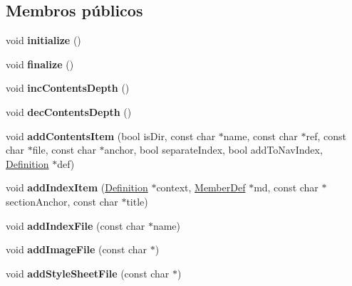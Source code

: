 \subsection*{Membros públicos}
\begin{DoxyCompactItemize}
\item 
\hypertarget{class_doc_sets_a25a40b6614565f755233080a384c35f1}{void {\bfseries initialize} ()}\label{class_doc_sets_a25a40b6614565f755233080a384c35f1}

\item 
\hypertarget{class_doc_sets_a32d626626eee0bc4ade146973f6abb1c}{void {\bfseries finalize} ()}\label{class_doc_sets_a32d626626eee0bc4ade146973f6abb1c}

\item 
\hypertarget{class_doc_sets_a96772b5eeae8044b3308f63fb040c253}{void {\bfseries inc\-Contents\-Depth} ()}\label{class_doc_sets_a96772b5eeae8044b3308f63fb040c253}

\item 
\hypertarget{class_doc_sets_a3a6a2629dd91105d0048f0d0a9f7f983}{void {\bfseries dec\-Contents\-Depth} ()}\label{class_doc_sets_a3a6a2629dd91105d0048f0d0a9f7f983}

\item 
\hypertarget{class_doc_sets_a2037325cd2bf36b4a134b87dbb107a94}{void {\bfseries add\-Contents\-Item} (bool is\-Dir, const char $\ast$name, const char $\ast$ref, const char $\ast$file, const char $\ast$anchor, bool separate\-Index, bool add\-To\-Nav\-Index, \hyperlink{class_definition}{Definition} $\ast$def)}\label{class_doc_sets_a2037325cd2bf36b4a134b87dbb107a94}

\item 
\hypertarget{class_doc_sets_acae96bcfb2681e31a0e64854dd3809fe}{void {\bfseries add\-Index\-Item} (\hyperlink{class_definition}{Definition} $\ast$context, \hyperlink{class_member_def}{Member\-Def} $\ast$md, const char $\ast$section\-Anchor, const char $\ast$title)}\label{class_doc_sets_acae96bcfb2681e31a0e64854dd3809fe}

\item 
\hypertarget{class_doc_sets_a8e569c4ea40f30de2accf0a87b7d8d30}{void {\bfseries add\-Index\-File} (const char $\ast$name)}\label{class_doc_sets_a8e569c4ea40f30de2accf0a87b7d8d30}

\item 
\hypertarget{class_doc_sets_ae96a05963365ea76e95ac32a7cce3fb2}{void {\bfseries add\-Image\-File} (const char $\ast$)}\label{class_doc_sets_ae96a05963365ea76e95ac32a7cce3fb2}

\item 
\hypertarget{class_doc_sets_a373a41a11f6707488992a715912f6f06}{void {\bfseries add\-Style\-Sheet\-File} (const char $\ast$)}\label{class_doc_sets_a373a41a11f6707488992a715912f6f06}

\end{DoxyCompactItemize}


